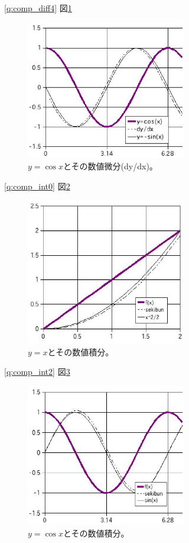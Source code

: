 \ref{q:comp_diff4}  図\ref{fig:graph_cosxdiff}
\begin{figure}[!h]
    \centering
    \includegraphics[width=7.0cm]{graph_cosxdiff.eps}
    \caption{$y=\cos x$とその数値微分(dy/dx)。\label{fig:graph_cosxdiff}}
\end{figure}



\ref{q:comp_int0}  図\ref{fig:graph_xinteg}
\begin{figure}[!h]
    \centering
    \includegraphics[width=7.0cm]{graph_xinteg.eps}
    \caption{$y=x$とその数値積分。\label{fig:graph_xinteg}}
\end{figure}

\ref{q:comp_int2}  図\ref{fig:graph_cosxinteg}
\begin{figure}[!h]
    \centering
    \includegraphics[width=7.0cm]{graph_cosxinteg.eps}
    \caption{$y=\cos x$とその数値積分。\label{fig:graph_cosxinteg}}
\end{figure}


